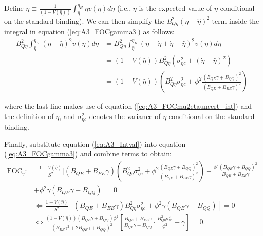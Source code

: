 \documentclass[12pt]{article}
\begin{document}
Define $\dot{\eta}\equiv\frac{1}{(1-V(\hat{\eta}))}\int_{\hat{\eta}}^{\eta_H}\eta v(\eta)d\eta$ (i.e., $\dot{\eta}$ is the expected value of $\eta$ conditional on the standard binding). We can then simplify the $B_{Q\eta}^2(\eta-\hat{\eta})^2$ term inside the integral in equation (\ref{eq:A3_FOCgamma3}) as follows:
\begin{align}
B_{Q\eta}^2\int_{\hat{\eta}}^{\eta_H}(\eta-\hat{\eta})^2v(\eta)d\eta &= B_{Q\eta}^2\int_{\hat{\eta}}^{\eta_H}(\eta-\dot{\eta}+\dot{\eta}-\hat{\eta})^2v(\eta)d\eta \nonumber \\
&= (1-V(\hat{\eta}))B_{Q\eta}^2(\sigma_{\eta c}^2 + (\dot{\eta}-\hat{\eta})^2) \nonumber \\
&= (1-V(\hat{\eta}))\left(B_{Q\eta}^2\sigma_{\eta c}^2 + \phi^2\frac{(B_{QE}\gamma+B_{QQ})^2}{(B_{QE}+B_{EE}\gamma)^2}\right) \label{eq:A3_Intval}
\end{align}

where the last line makes use of equation (\ref{eq:A3_FOCmu2etauncert_int}) and the definition of $\dot{\eta}$, and $\sigma_{\eta c}^2$ denotes the variance of $\eta$ conditional on the standard binding.

Finally, substitute equation (\ref{eq:A3_Intval}) into equation (\ref{eq:A3_FOCgamma3}) and combine terms to obtain:
\begin{align}
\text{FOC}_{\gamma}:& \text{ } \frac{1-V(\hat{\eta})}{S^2}[(B_{QE}+B_{EE}\gamma)\left(B_{Q\eta}^2\sigma_{\eta c}^2 + \phi^2\frac{(B_{QE}\gamma+B_{QQ})^2}{(B_{QE}+B_{EE}\gamma)^2}\right) - \frac{\phi^2(B_{QE}\gamma+B_{QQ})^2}{B_{QE}+B_{EE}\gamma} \nonumber \\
& + \phi^2\gamma(B_{QE}\gamma+B_{QQ})] = 0 \\
&\Leftrightarrow \frac{1-V(\hat{\eta})}{S^2}[(B_{QE}+B_{EE}\gamma)B_{Q\eta}^2\sigma_{\eta c}^2 + \phi^2\gamma(B_{QE}\gamma+B_{QQ})] = 0 \\
&\Leftrightarrow \frac{(1-V(\hat{\eta}))(B_{QE}\gamma+B_{QQ})\phi^2} {(B_{EE}\gamma^2+2B_{QE}\gamma+B_{QQ})^2}\left[\frac{B_{QE}+B_{EE}\gamma}{B_{QE}\gamma+B_{QQ}}\cdot \frac{B_{Q\eta}^2\sigma_{\eta c}^2}{\phi^2}+\gamma\right]=0. \label{eq:A3_final}
\end{align}
\end{document}
